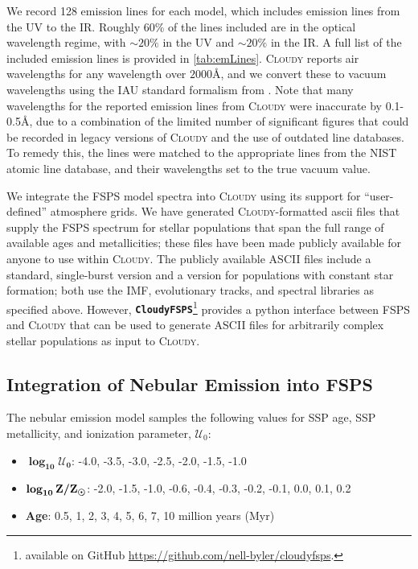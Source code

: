 \documentclass[twocolumn, tighten]{aastex61}
\newcommand{\Tab}[1]{\autoref{tab:#1}}
\newcommand{\FSPS}{{\sc FSPS}\xspace}
\newcommand{\CloudyFSPS}{{\tt \textbf{CloudyFSPS}}\xspace}
\newcommand{\Cloudy}{\textsc{Cloudy}\xspace}
\newcommand{\ang}{\ensuremath{\mbox{\AA}}}
\newcommand{\U}{\ensuremath{\mathcal{U}_{0}}}
\begin{document}
We record 128 emission lines for each model, which includes emission lines from the UV to the IR. Roughly 60\% of the lines included are in the optical wavelength regime, with ${\sim20}\%$ in the UV and ${\sim}20\%$ in the IR. A full list of the included emission lines is provided in \Tab{emLines}. \Cloudy reports air wavelengths for any wavelength over $2000\ang$, and we convert these to vacuum wavelengths using the IAU standard formalism from \citet{Morton1991}. Note that many wavelengths for the reported emission lines from \Cloudy were inaccurate by 0.1-0.5\AA, due to a combination of the limited number of significant figures that could be recorded in legacy versions of \Cloudy and the use of outdated line databases. To remedy this, the lines were matched to the appropriate lines from the NIST atomic line database, and their wavelengths set to the true vacuum value.

We integrate the \FSPS model spectra into \Cloudy using its support for ``user-defined'' atmosphere grids. We have generated \Cloudy-formatted ascii files that supply the \FSPS spectrum for stellar populations that span the full range of available ages and metallicities; these files have been made publicly available for anyone to use within \Cloudy. The publicly available ASCII files include a standard, single-burst version and a version for populations with constant star formation; both use the IMF, evolutionary tracks, and spectral libraries as specified above. However, \CloudyFSPS\footnote{available on GitHub \url{https://github.com/nell-byler/cloudyfsps}.} provides a python interface between \FSPS and \Cloudy that can be used to generate ASCII files for arbitrarily complex stellar populations as input to \Cloudy.

\subsection{Integration of Nebular Emission into \FSPS}\label{sec:methods:fsps}

The nebular emission model samples the following values for SSP age, SSP metallicity, and ionization parameter, \U{}:
\begin{itemize}
\item[] $\boldsymbol{\log_{10} \mathcal{U}_0}$: -4.0, -3.5, -3.0, -2.5, -2.0, -1.5, -1.0
\item[] $\boldsymbol{\log_{10} {\rm Z}/{\rm Z}_{\odot}}$: -2.0, -1.5, -1.0, -0.6, -0.4, -0.3, -0.2, -0.1, 0.0, 0.1, 0.2
\item[] {\bf Age}: 0.5, 1, 2, 3, 4, 5, 6, 7, 10 million years (Myr)
\end{itemize}
\end{document}
